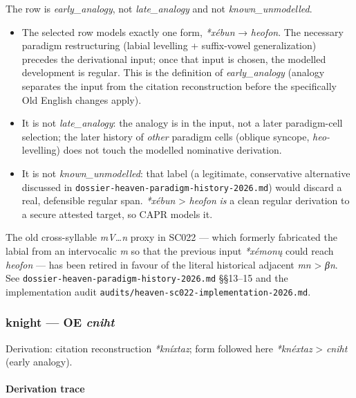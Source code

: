 \documentclass[
  british,
  a4paper,
]{article}
\providecommand{\tightlist}{%
  \setlength{\itemsep}{0pt}\setlength{\parskip}{0pt}}
\providecommand{\Recon}[1]{\emph{*#1}}
\begin{document}
The row is \emph{early\_analogy}, not \emph{late\_analogy} and not
\emph{known\_unmodelled}.

\begin{itemize}
\tightlist
\item
  The selected row models exactly one form, \Recon{xébun} →
  {\emph{heofon}}. The necessary paradigm restructuring (labial
  levelling + suffix-vowel generalization) precedes the derivational
  input; once that input is chosen, the modelled development is regular.
  This is the definition of \emph{early\_analogy} (analogy separates the
  input from the citation reconstruction before the specifically Old
  English changes apply).
\item
  It is not \emph{late\_analogy}: the analogy is in the input, not a
  later paradigm-cell selection; the later history of \emph{other}
  paradigm cells (oblique syncope, \emph{heo-} levelling) does not touch
  the modelled nominative derivation.
\item
  It is not \emph{known\_unmodelled}: that label (a legitimate,
  conservative alternative discussed in
  \texttt{dossier-heaven-paradigm-history-2026.md}) would discard a
  real, defensible regular span. \emph{*xébun} \textgreater{}
  \emph{heofon} \emph{is} a clean regular derivation to a secure
  attested target, so CAPR models it.
\end{itemize}

The old cross-syllable \emph{mV\ldots n} proxy in SC022 --- which
formerly fabricated the labial from an intervocalic \emph{m} so that the
previous input \emph{*xémonų} could reach \emph{heofon} --- has been
retired in favour of the literal historical adjacent \emph{mn}
\textgreater{} \emph{βn}. See
\texttt{dossier-heaven-paradigm-history-2026.md} §§13--15 and the
implementation audit
\texttt{audits/heaven-sc022-implementation-2026.md}.

\subsubsection{\texorpdfstring{knight --- OE
\emph{cniht}}{knight --- OE cniht}}\label{knight-oe-cniht}

Derivation: citation reconstruction \emph{*kníxtaz}; form followed here
\emph{*knéxtaz} \textgreater{} \emph{cniht} (early analogy).

\paragraph{Derivation trace}\label{derivation-trace-96}
\end{document}
